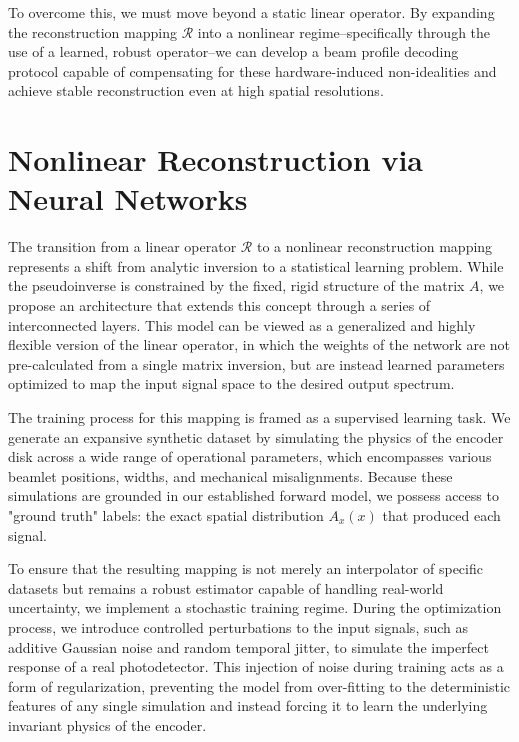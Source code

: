 \documentclass[8pt,a4paper]{report}
\begin{document}
	To overcome this, we must move beyond a static linear operator. By expanding the reconstruction mapping $\mathcal{R}$ into a nonlinear regime--specifically through the use of a learned, robust operator--we can develop a beam profile decoding protocol capable of compensating for these hardware-induced non-idealities and achieve stable reconstruction even at high spatial resolutions.
	
	\section{Nonlinear Reconstruction via Neural Networks}
	
	
	The transition from a linear operator $\mathcal{R}$ to a nonlinear reconstruction mapping represents a shift from analytic inversion to a statistical learning problem. While the pseudoinverse is constrained by the fixed, rigid structure of the matrix $A$, we propose an architecture that extends this concept through a series of interconnected layers. This model can be viewed as a generalized and highly flexible version of the linear operator, in which the weights of the network are not pre-calculated from a single matrix inversion, but are instead learned parameters optimized to map the input signal space to the desired output spectrum.
	
	The training process for this mapping is framed as a supervised learning task. We generate an expansive synthetic dataset by simulating the physics of the encoder disk across a wide range of operational parameters, which encompasses various beamlet positions, widths, and mechanical misalignments. Because these simulations are grounded in our established forward model, we possess access to "ground truth" labels: the exact spatial distribution $A_x(x)$ that produced each signal.
	
	To ensure that the resulting mapping is not merely an interpolator of specific datasets but remains a robust estimator capable of handling real-world uncertainty, we implement a stochastic training regime. During the optimization process, we introduce controlled perturbations to the input signals, such as additive Gaussian noise and random temporal jitter, to simulate the imperfect response of a real photodetector. This injection of noise during training acts as a form of regularization, preventing the model from over-fitting to the deterministic features of any single simulation and instead forcing it to learn the underlying invariant physics of the encoder.
	
\end{document}
